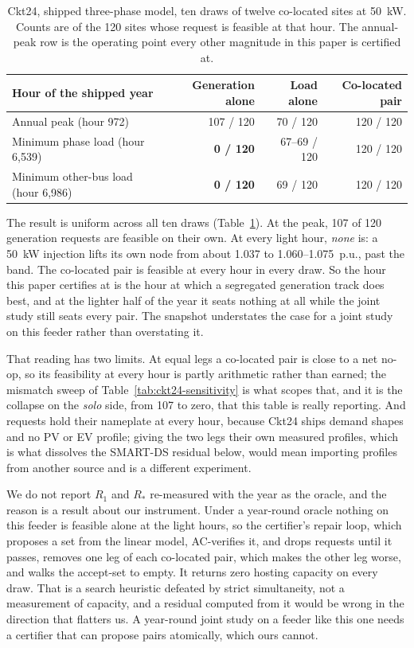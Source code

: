 \documentclass[review,authoryear,12pt]{elsarticle}
\begin{document}
\begin{table}[htbp]
\centering
\caption{Ckt24, shipped three-phase model, ten draws of twelve co-located sites
at 50~kW. Counts are of the 120 sites whose request is feasible at that hour.
The annual-peak row is the operating point every other magnitude in this paper
is certified at.}
\label{tab:ckt24-year}
\small
\begin{tabular}{@{}lrrr@{}}
\toprule
Hour of the shipped year & Generation alone & Load alone & Co-located pair \\
\midrule
Annual peak (hour 972) & 107 / 120 & 70 / 120 & 120 / 120 \\
Minimum phase load (hour 6{,}539) & \textbf{0 / 120} & 67--69 / 120 & 120 / 120 \\
Minimum other-bus load (hour 6{,}986) & \textbf{0 / 120} & 69 / 120 & 120 / 120 \\
\bottomrule
\end{tabular}
\end{table}

The result is uniform across all ten draws (Table~\ref{tab:ckt24-year}). At the
peak, 107 of 120 generation requests are feasible on their own. At every light
hour, \emph{none} is: a 50~kW injection lifts its own node from about 1.037 to
1.060--1.075~p.u., past the band. The co-located pair is feasible at every hour
in every draw. So the hour this paper certifies at is the hour at which a
segregated generation track does best, and at the lighter half of the year it
seats nothing at all while the joint study still seats every pair. The snapshot
understates the case for a joint study on this feeder rather than overstating
it.

That reading has two limits. At equal legs a co-located pair is close to a net
no-op, so its feasibility at every hour is partly arithmetic rather than
earned; the mismatch sweep of Table~\ref{tab:ckt24-sensitivity} is what scopes
that, and it is the collapse on the \emph{solo} side, from 107 to zero, that
this table is really reporting. And requests hold their nameplate at every
hour, because Ckt24 ships demand shapes and no PV or EV profile; giving the two
legs their own measured profiles, which is what dissolves the SMART-DS residual
below, would mean importing profiles from another source and is a different
experiment.

We do not report $R_{1}$ and $R_{\ast}$ re-measured with the year as the
oracle, and the reason is a result about our instrument. Under a year-round
oracle nothing on this feeder is feasible alone at the light hours, so the
certifier's repair loop, which proposes a set from the linear model, AC-verifies
it, and drops requests until it passes, removes one leg of each co-located pair,
which makes the other leg worse, and walks the accept-set to empty. It returns
zero hosting capacity on every draw. That is a search heuristic defeated by
strict simultaneity, not a measurement of capacity, and a residual computed
from it would be wrong in the direction that flatters us. A year-round joint
study on a feeder like this one needs a certifier that can propose pairs
atomically, which ours cannot.
\end{document}
